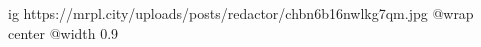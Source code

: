  
 
 
 
 

\ifcmt
  ig https://mrpl.city/uploads/posts/redactor/chbn6b16nwlkg7qm.jpg
  @wrap center
  @width 0.9
\fi
